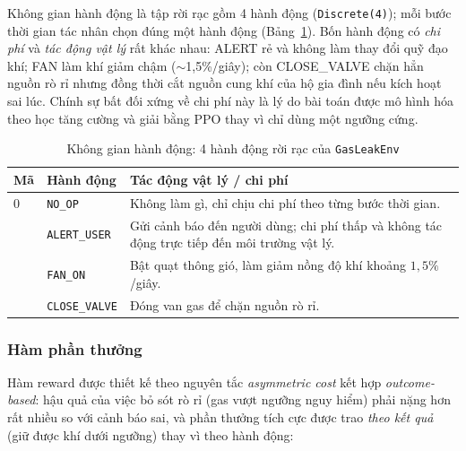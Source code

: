 Không gian hành động là tập rời rạc gồm 4 hành động (\texttt{Discrete(4)}); mỗi bước thời gian tác nhân chọn đúng một hành động (Bảng~\ref{tab:rl_action}). Bốn hành động có \emph{chi phí} và \emph{tác động vật lý} rất khác nhau: ALERT rẻ và không làm thay đổi quỹ đạo khí; FAN làm khí giảm chậm ($\sim$1,5\%/giây); còn CLOSE\_VALVE chặn hẳn nguồn rò rỉ nhưng đồng thời cắt nguồn cung khí của hộ gia đình nếu kích hoạt sai lúc. Chính sự bất đối xứng về chi phí này là lý do bài toán được mô hình hóa theo học tăng cường và giải bằng PPO thay vì chỉ dùng một ngưỡng cứng.

\begingroup
\small
\renewcommand{\arraystretch}{1.25}
\setlength{\tabcolsep}{4pt}

\begin{longtable}{
  >{\centering\arraybackslash}p{1.0cm}
  >{\raggedright\arraybackslash}p{3.2cm}
  >{\raggedright\arraybackslash}p{8.0cm}
}
\caption{Không gian hành động: 4 hành động rời rạc của \texttt{GasLeakEnv}}
\label{tab:rl_action} \\
\toprule
\textbf{Mã} 
& \textbf{Hành động} 
& \textbf{Tác động vật lý / chi phí} \\
\midrule
\endfirsthead

\endhead

\endfoot

\bottomrule
\endlastfoot

0 
& \texttt{NO\_OP}       
& Không làm gì, chỉ chịu chi phí theo từng bước thời gian. \\

1 
& \texttt{ALERT\_USER}  
& Gửi cảnh báo đến người dùng; chi phí thấp và không tác động trực tiếp đến môi trường vật lý. \\

2 
& \texttt{FAN\_ON}      
& Bật quạt thông gió, làm giảm nồng độ khí khoảng $1{,}5\%$/giây. \\

3 
& \texttt{CLOSE\_VALVE} 
& Đóng van gas để chặn nguồn rò rỉ. \\

\end{longtable}
\endgroup

\subsubsection*{Hàm phần thưởng}

Hàm reward được thiết kế theo nguyên tắc \textit{asymmetric cost} kết hợp \textit{outcome-based}: hậu quả của việc bỏ sót rò rỉ (gas vượt ngưỡng nguy hiểm) phải nặng hơn rất nhiều so với cảnh báo sai, và phần thưởng tích cực được trao \emph{theo kết quả} (giữ được khí dưới ngưỡng) thay vì theo hành động:

